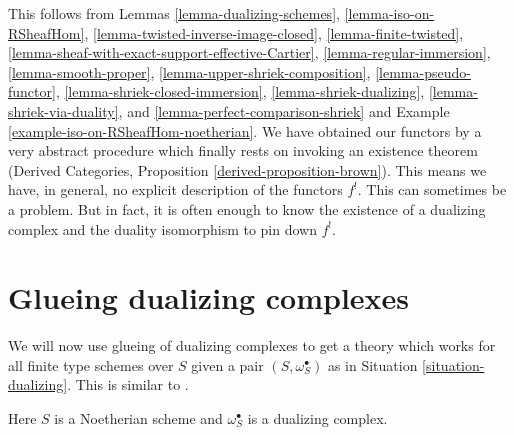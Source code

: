 This follows from Lemmas
\ref{lemma-dualizing-schemes},
\ref{lemma-iso-on-RSheafHom},
\ref{lemma-twisted-inverse-image-closed},
\ref{lemma-finite-twisted},
\ref{lemma-sheaf-with-exact-support-effective-Cartier},
\ref{lemma-regular-immersion},
\ref{lemma-smooth-proper},
\ref{lemma-upper-shriek-composition},
\ref{lemma-pseudo-functor},
\ref{lemma-shriek-closed-immersion},
\ref{lemma-shriek-dualizing},
\ref{lemma-shriek-via-duality}, and
\ref{lemma-perfect-comparison-shriek} and
Example \ref{example-iso-on-RSheafHom-noetherian}.
We have obtained our functors by a very abstract procedure
which finally rests on invoking an existence theorem
(Derived Categories, Proposition \ref{derived-proposition-brown}).
This means we have, in general, no explicit description of the functors $f^!$.
This can sometimes be a problem. But in fact, it is often enough to know
the existence of a dualizing complex and the duality isomorphism
to pin down $f^!$.






\section{Glueing dualizing complexes}
\label{section-glue}

\noindent
We will now use glueing of dualizing complexes to get a theory which works for
all finite type schemes over $S$ given a pair $(S, \omega_S^\bullet)$
as in Situation \ref{situation-dualizing}. This is similar to
\cite[Remark on page 310]{RD}.

\begin{situation}
\label{situation-dualizing}
Here $S$ is a Noetherian scheme and $\omega_S^\bullet$ is a dualizing
complex.
\end{situation}

